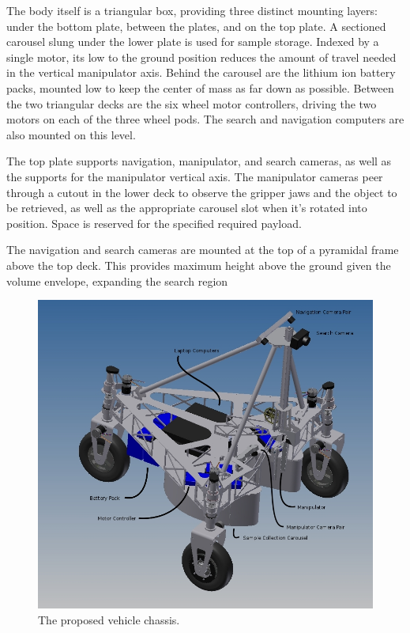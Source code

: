 \documentclass[12pt]{article}
\begin{document}
The body itself is a triangular box, providing three distinct mounting layers: under the bottom plate, between the plates, and on the top plate. A sectioned carousel slung under the lower plate is used for sample storage. Indexed by a single motor, its low to the ground position reduces the amount of travel needed in the vertical manipulator axis. Behind the carousel are the lithium ion battery packs, mounted low to keep the center of mass as far down as possible. Between the two triangular decks are the six wheel motor controllers, driving the two motors on each of the three wheel pods. The search and navigation computers are also mounted on this level.

The top plate supports navigation, manipulator, and search cameras, as well as the supports for the manipulator vertical axis. The manipulator cameras peer through a cutout in the lower deck to observe the gripper jaws and the object to be retrieved, as well as the appropriate carousel slot when it's rotated into position. Space is reserved for the specified required payload.

The navigation and search cameras are mounted at the top of a pyramidal frame above the top deck. This provides maximum height above the ground given the volume envelope, expanding the search region



\begin{figure}[htbp]
\centering
\includegraphics[width=4.5in]{../assets/overalliso.jpg}
\caption{The proposed vehicle chassis.}
\label{fig_bot_chassis}
\end{figure}
\end{document}
